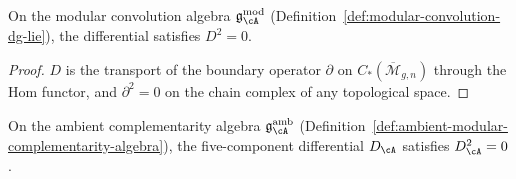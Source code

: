 \begin{theorem}
\label{thm:convolution-d-squared-zero}
On the modular convolution algebra
$\mathfrak{g}_{\cA}^{\mathrm{mod}}$
\textup{(}Definition~\textup{\ref{def:modular-convolution-dg-lie})},
the differential satisfies $D^2 = 0$.
\end{theorem}

\begin{proof}
$D$ is the transport of the boundary operator $\partial$ on
$C_*(\overline{\mathcal{M}}_{g,n})$ through the Hom functor, and
$\partial^2 = 0$ on the chain complex of any topological space.
\end{proof}

\begin{theorem}
\label{conj:differential-square-zero}
\label{thm:ambient-d-squared-zero}
On the ambient complementarity algebra
$\mathfrak{g}^{\mathrm{amb}}_{\cA}$
\textup{(}Definition~\textup{\ref{def:ambient-modular-complementarity-algebra})},
the five-component differential $D_{\cA}$ satisfies
$D_{\cA}^2 = 0$.
\end{theorem}

